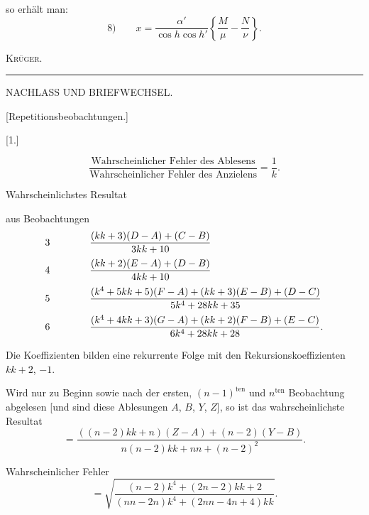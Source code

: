 \noindent so erhält man:
\[
\text{8)}\qquad x=\frac{\alpha'}{\cos h\cos h'}\left\{\frac M\mu-\frac N\nu\right\}.
\]
\begin{flushright}\textsc{Krüger.}\end{flushright}
\par\endgroup
\begin{center}\rule{3.5cm}{.4pt}\end{center}
\noindent{}\par

\par\clearpage
\begin{center}
{\Large NACHLASS UND BRIEFWECHSEL.}\par\vspace{1cm}
{\large [Repetitionsbeobachtungen.]}\par\bigskip
{[}1.]
\end{center}
\[
\frac{\text{Wahrscheinlicher Fehler des Ablesens}}{\text{Wahrscheinlicher Fehler des Anzielens}}=\frac1k.
\]
\begin{center}Wahrscheinlichstes Resultat\end{center}
\noindent aus Beobachtungen
\[
\begin{array}{c@{\qquad\qquad}l}
3&\dfrac{(kk+3)(D-A)+(C-B)}{3kk+10}\\[10pt]
4&\dfrac{(kk+2)(E-A)+(D-B)}{4kk+10}\\[10pt]
5&\dfrac{(k^4+5kk+5)(F-A)+(kk+3)(E-B)+(D-C)}{5k^4+28kk+35}\\[10pt]
6&\dfrac{(k^4+4kk+3)(G-A)+(kk+2)(F-B)+(E-C)}{6k^4+28kk+28}.
\end{array}
\]
\par\noindent\hspace*{\parindent}Die Koeffizienten bilden eine rekurrente Folge mit den Rekursionskoeffizienten $kk+2$, $-1$.
\par\bigskip\noindent\hspace*{\parindent}Wird nur zu Beginn sowie nach der ersten, $(n-1)^{\text{ten}}$ und $n^{\text{ten}}$ Beobachtung abgelesen [und sind diese Ablesungen $A$, $B$, $Y$, $Z$], so ist das wahrscheinlichste Resultat
\[
=\frac{((n-2)kk+n)(Z-A)+(n-2)(Y-B)}{n(n-2)kk+nn+(n-2)^2}.
\]
\par\noindent\hspace*{\parindent}Wahrscheinlicher Fehler
\[
=\sqrt{\frac{(n-2)k^4+(2n-2)kk+2}{(nn-2n)k^4+(2nn-4n+4)kk}}.
\]

